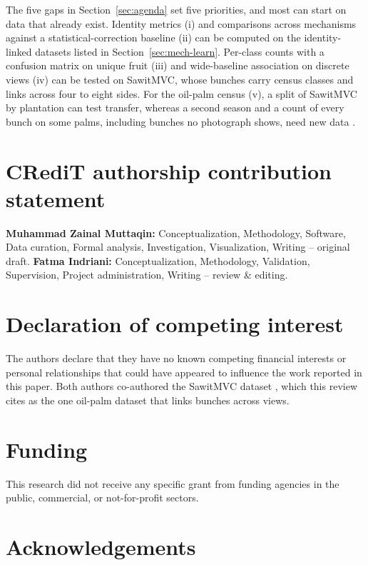 The five gaps in Section~\ref{sec:agenda} set five priorities, and most can start on data that already exist. Identity metrics (i) and comparisons across mechanisms against a statistical-correction baseline (ii) can be computed on the identity-linked datasets listed in Section~\ref{sec:mech-learn}. Per-class counts with a confusion matrix on unique fruit (iii) and wide-baseline association on discrete views (iv) can be tested on SawitMVC, whose bunches carry census classes and links across four to eight sides. For the oil-palm census (v), a split of SawitMVC by plantation can test transfer, whereas a second season and a count of every bunch on some palms, including bunches no photograph shows, need new data \citep{indriani2026sawitmvc}.

\section*{CRediT authorship contribution statement}
\textbf{Muhammad Zainal Muttaqin:} Conceptualization, Methodology, Software, Data curation, Formal analysis, Investigation, Visualization, Writing -- original draft. \textbf{Fatma Indriani:} Conceptualization, Methodology, Validation, Supervision, Project administration, Writing -- review \& editing.

\section*{Declaration of competing interest}
The authors declare that they have no known competing financial interests or personal relationships that could have appeared to influence the work reported in this paper. Both authors co-authored the SawitMVC dataset \citep{indriani2026sawitmvc}, which this review cites as the one oil-palm dataset that links bunches across views.

\section*{Funding}
This research did not receive any specific grant from funding agencies in the public, commercial, or not-for-profit sectors. 

\section*{Acknowledgements}

